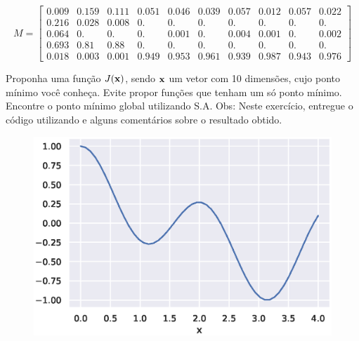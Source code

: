 \documentclass{homeworkclass}
\begin{document}
\begin{homeworkProblem}
\begin{homeworkSection}
\begin{equation*}
M = \begin{bmatrix}
0.009 & 0.159 & 0.111 & 0.051 & 0.046 & 0.039 & 0.057 & 0.012 & 0.057 &
0.022 \\
0.216 & 0.028 & 0.008 & 0.    & 0.    & 0.    & 0.    & 0.    & 0.    &
0.   \\
0.064 & 0.    & 0.    & 0.    & 0.001 & 0.    & 0.004 & 0.001 & 0.    &
0.002 \\
0.693 & 0.81  & 0.88  & 0.    & 0.    & 0.    & 0.    & 0.    & 0.    &
0.   \\
0.018 & 0.003 & 0.001 & 0.949 & 0.953 & 0.961 & 0.939 & 0.987 & 0.943 & 0.976
\end{bmatrix}
\end{equation*}

\end{homeworkSection}



\end{homeworkProblem}

\begin{homeworkProblem}
Proponha uma função $J(\mathbf{x})$, sendo $\mathbf{x}$ um vetor com 10 dimensões, cujo ponto mínimo você conheça. Evite propor funções que tenham um só ponto mínimo. Encontre o ponto mínimo global utilizando S.A. Obs: Neste exercício, entregue o código utilizando e alguns comentários sobre o resultado obtido.
\end{homeworkProblem}

\begin{figure}[!h]
	\centering
	\includegraphics[width=0.7\linewidth]{figs/cos}
\end{figure}
\end{document}
